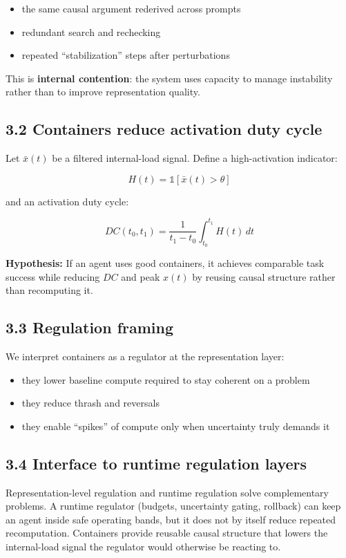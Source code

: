 \documentclass[11pt]{article}
\begin{document}
\begin{itemize}
\item the same causal argument rederived across prompts
\item redundant search and rechecking
\item repeated “stabilization” steps after perturbations
\end{itemize}

This is \textbf{internal contention}: the system uses capacity to manage instability rather than to improve representation quality.

\subsection*{3.2 Containers reduce activation duty cycle}
Let \(\bar x(t)\) be a filtered internal-load signal. Define a high-activation indicator:

\[
H(t) = \mathbb{1}[\bar x(t) > \theta]
\]

and an activation duty cycle:

\[
DC(t_0,t_1) = \frac{1}{t_1-t_0}\int_{t_0}^{t_1} H(t)\,dt
\]

\textbf{Hypothesis:} If an agent uses good containers, it achieves comparable task success while reducing \(DC\) and peak \(x(t)\) by reusing causal structure rather than recomputing it.

\subsection*{3.3 Regulation framing}
We interpret containers as a regulator at the representation layer:

\begin{itemize}
\item they lower baseline compute required to stay coherent on a problem
\item they reduce thrash and reversals
\item they enable “spikes” of compute only when uncertainty truly demands it
\end{itemize}\subsection*{3.4 Interface to runtime regulation layers}
Representation-level regulation and runtime regulation solve complementary problems. A runtime regulator (budgets, uncertainty gating, rollback) can keep an agent inside safe operating bands, but it does not by itself reduce repeated recomputation. Containers provide reusable causal structure that lowers the internal-load signal the regulator would otherwise be reacting to.
\end{document}
